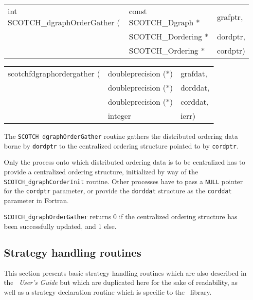 \begin{itemize}
\progsyn

{\tt\begin{tabular}{l@{}ll}
int SCOTCH\_dgraphOrderGather ( & const SCOTCH\_Dgraph * & grafptr, \\
                                & SCOTCH\_Dordering *    & dordptr, \\
                                & SCOTCH\_Ordering *     & cordptr)
\end{tabular}}

{\tt\begin{tabular}{l@{}ll}
scotchfdgraphordergather ( & doubleprecision (*) & grafdat, \\
                           & doubleprecision (*) & dorddat, \\
                           & doubleprecision (*) & corddat, \\
                           & integer             & ierr)
\end{tabular}}

\progdes

The {\tt SCOTCH\_dgraph\lbt Order\lbt Gather} routine gathers the
distributed ordering data borne by {\tt dordptr} to the
centralized ordering structure pointed to by {\tt cordptr}.

Only the process onto which distributed ordering data is to be
centralized has to provide a centralized ordering structure,
initialized by way of the {\tt SCOTCH\_dgraph\lbt Corder\lbt Init}
routine. Other processes have to pass a \texttt{NULL} pointer for the
\texttt{cordptr} parameter, or provide the \texttt{dorddat} structure
as the \texttt{corddat} parameter in Fortran.

\progret

{\tt SCOTCH\_dgraphOrderGather} returns $0$ if the centralized
ordering structure has been successfully updated, and $1$ else.
\end{itemize}

\subsection{Strategy handling routines}
\label{sec-lib-strat}

This section presents basic strategy handling routines which are also
described in the {\it\scotch\ User's Guide} but which are duplicated
here for the sake of readability, as well as a strategy declaration
routine which is specific to the \ptscotch\ library.

